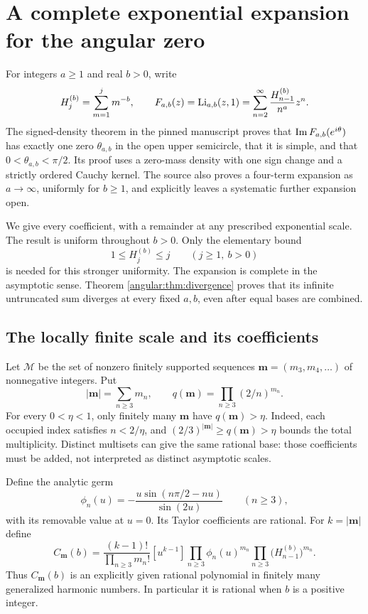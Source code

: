 \section{A complete exponential expansion for the angular zero}
\label{angular:sec:main}

For integers $a\geq1$ and real $b>0$, write
\[
 H_j^{(b)}=\sum_{m=1}^j m^{-b},\qquad
 F_{a,b}(z)=\operatorname{Li}_{a,b}(z,1)
   =\sum_{n=2}^{\infty}\frac{H_{n-1}^{(b)}}{n^a}z^n.
\]
The signed-density theorem in the pinned manuscript
\cite[\texttt{signed:thm:unique-zero}]{ProveItSnapshot}
proves that $\operatorname{Im} F_{a,b}(e^{i\theta})$ has exactly one zero
$\theta_{a,b}$ in the open upper semicircle, that it is simple, and
that $0<\theta_{a,b}<\pi/2$.  Its proof uses a zero-mass density
with one sign change and a strictly ordered Cauchy kernel.  The source
also proves a four-term expansion as $a\to\infty$, uniformly for
$b\geq1$, and explicitly leaves a systematic further expansion open.

We give every coefficient, with a remainder at any prescribed
exponential scale.  The result is uniform throughout $b>0$.  Only
the elementary bound
\begin{equation}\label{angular:eq:hbound}
 1\leq H_j^{(b)}\leq j\qquad(j\geq1,\ b>0)
\end{equation}
is needed for this stronger uniformity.  The expansion is complete in the asymptotic sense. Theorem
\ref{angular:thm:divergence} proves that its infinite untruncated sum
diverges at every fixed $a,b$, even after equal bases are combined.

\subsection{The locally finite scale and its coefficients}

Let $\mathscr M$ be the set of nonzero finitely supported sequences
$\mathbf m=(m_3,m_4,\ldots)$ of nonnegative integers. Put
\[
 |\mathbf m|=\sum_{n\geq3}m_n,
 \qquad q(\mathbf m)=\prod_{n\geq3}(2/n)^{m_n}.
\]
For every $0<\eta<1$, only finitely many $\mathbf m$ have
$q(\mathbf m)>\eta$. Indeed, each occupied index satisfies
$n<2/\eta$, and $(2/3)^{|\mathbf m|}\geq q(\mathbf m)>\eta$ bounds
the total multiplicity. Distinct multisets can give the same rational
base: those coefficients must be added, not interpreted as distinct
asymptotic scales.

Define the analytic germ
\begin{equation}\label{angular:eq:phi}
 \phi_n(u)=-\frac{u\sin(n\pi/2-nu)}{\sin(2u)}\qquad(n\geq3),
\end{equation}
with its removable value at $u=0$. Its Taylor coefficients are rational.
For $k=|\mathbf m|$ define
\begin{equation}\label{angular:eq:coefficient}
 C_{\mathbf m}(b)=
 \frac{(k-1)!}{\prod_{n\geq3}m_n!}
 [u^{k-1}]\prod_{n\geq3}\phi_n(u)^{m_n}
 \prod_{n\geq3}\bigl(H_{n-1}^{(b)}\bigr)^{m_n}.
\end{equation}
Thus $C_{\mathbf m}(b)$ is an explicitly given rational polynomial
in finitely many generalized harmonic numbers. In particular it is
rational when $b$ is a positive integer.

